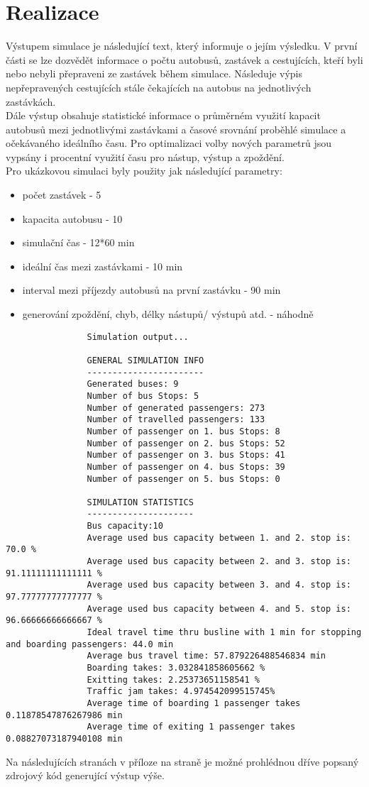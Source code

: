 \documentclass{article}
\begin{document}
	\section{Realizace}
		Výstupem simulace je následující text, který informuje o jejím výsledku. V první části se lze dozvědět informace o počtu autobusů, zastávek a cestujících, kteří byli nebo nebyli přepraveni ze zastávek během simulace. Následuje výpis nepřepravených cestujících stále čekajících na autobus na jednotlivých zastávkách.\\
		Dále výstup obsahuje statistické informace o průměrném využití kapacit autobusů mezi jednotlivými zastávkami a časové srovnání proběhlé simulace a očekávaného ideálního času. Pro optimalizaci volby nových parametrů jsou vypsány i procentní využití času pro nástup, výstup a zpoždění.\\
		Pro ukázkovou simulaci byly použity jak následující parametry:
			\begin{itemize}
				\item počet zastávek - 5
				\item kapacita autobusu - 10
				\item simulační čas - 12*60 min
				\item ideální čas mezi zastávkami - 10 min
				\item interval mezi příjezdy autobusů na první zastávku - 90 min
				\item generování zpoždění, chyb, délky nástupů/ výstupů atd. - náhodně
			\end{itemize}
		
			\begin{verbatim}
				Simulation output...
				
				GENERAL SIMULATION INFO
				-----------------------
				Generated buses: 9
				Number of bus Stops: 5
				Number of generated passengers: 273
				Number of travelled passengers: 133
				Number of passenger on 1. bus Stops: 8
				Number of passenger on 2. bus Stops: 52
				Number of passenger on 3. bus Stops: 41
				Number of passenger on 4. bus Stops: 39
				Number of passenger on 5. bus Stops: 0
				
				SIMULATION STATISTICS
				---------------------
				Bus capacity:10
				Average used bus capacity between 1. and 2. stop is: 70.0 %
				Average used bus capacity between 2. and 3. stop is: 91.11111111111111 %
				Average used bus capacity between 3. and 4. stop is: 97.77777777777777 %
				Average used bus capacity between 4. and 5. stop is: 96.66666666666667 %
				Ideal travel time thru busline with 1 min for stopping and boarding passengers: 44.0 min
				Average bus travel time: 57.879226488546834 min
				Boarding takes: 3.032841858605662 %
				Exitting takes: 2.25373651158541 %
				Traffic jam takes: 4.974542099515745%
				Average time of boarding 1 passenger takes 0.11878547876267986 min
				Average time of exiting 1 passenger takes 0.08827073187940108 min
			\end{verbatim}
		\vspace{5mm}
		\noindent
		Na následujících stranách v příloze na straně \pageref{priloha1} je možné prohlédnou dříve popsaný zdrojový kód generující výstup výše.
\end{document}
